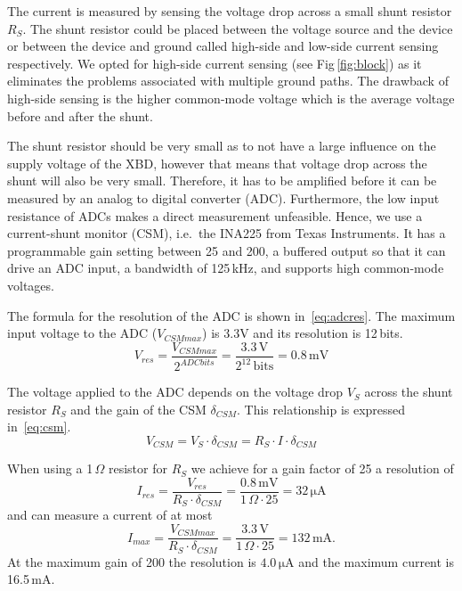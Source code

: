 \documentclass[twoside,11pt]{cergdoc}
\begin{document}
The current is measured by sensing the voltage drop across a small shunt resistor $R_S$.
The shunt resistor could be placed between the voltage source and the device
or between the device and ground called high-side and low-side current sensing
respectively. We opted for high-side current sensing (see Fig\,\ref{fig:block})
as it eliminates the problems associated with multiple ground paths. 
The drawback of high-side sensing is the higher common-mode voltage which is the
average voltage before and after the shunt. 


The shunt resistor should be very small as to not have a large influence on 
the supply voltage of the XBD, however that means that voltage drop across the shunt will
also be very small. Therefore, it has to be amplified before it can be measured by 
an analog to digital converter (ADC). Furthermore, the low input resistance
of ADCs makes a direct measurement unfeasible.  
Hence, we use a current-shunt monitor (CSM), i.e.\ the INA225 from Texas Instruments.
It has a programmable gain setting between 25 and 200, a buffered output so that it
can drive an ADC input, a bandwidth of 125\,kHz, and supports high common-mode voltages.

The formula for the resolution of the ADC is shown in~\eqref{eq:adcres}. The maximum input voltage
to the ADC ($V_{CSMmax}$) is 3.3V and its resolution is 12\,bits. 
\begin{equation}
  V_{res}=\frac{V_{CSMmax}}{2^{ADCbits}} = \frac{3.3\,\mathrm{V}}{2^{12}\,\mathrm{bits}} = 0.8\,\mathrm{mV} \label{eq:adcres}
\end{equation}

The voltage applied to the ADC depends on the voltage drop $V_S$ across the shunt resistor
$R_S$ and the gain of the CSM $\delta_{CSM}$. This relationship is expressed in~\eqref{eq:csm}.
\begin{equation}
  V_{CSM} = V_S \cdot \delta_{CSM} = R_S \cdot I \cdot \delta_{CSM} \label{eq:csm}
\end{equation}

When using a 1\,$\Omega$ resistor for $R_S$ we achieve for a gain factor of 25 a resolution of
%
\[I_{res} = \frac{V_{res}}{R_S \cdot \delta_{CSM}} = \frac{0.8\,\mathrm{mV}}{1\,\Omega \cdot 25} = 32\,\mathrm{\mu A}\]
%
and can measure a current of at most
%
\[I_{max} = \frac{V_{CSMmax}}{R_S \cdot \delta_{CSM}} = \frac{3.3\,\mathrm{V}}{1\,\Omega \cdot 25} = 132\,\mathrm{mA}.\]
%
%
At the maximum gain of 200 the resolution is $4.0\,\mathrm{\mu A}$ and the maximum current is 16.5\,mA.
\end{document}
